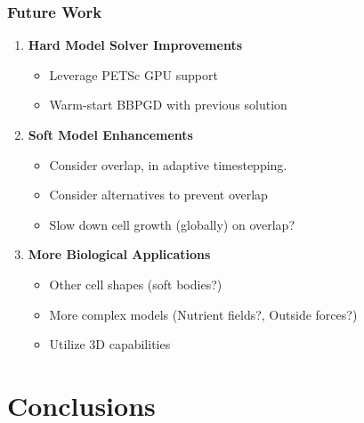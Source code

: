 \documentclass[10pt,t]{beamer}
\begin{document}
\begin{frame}
    \frametitle{Future Work}

    \begin{enumerate}
        \item \textbf{Hard Model Solver Improvements}
              \begin{itemize}
                  \item Leverage PETSc GPU support
                  \item Warm-start BBPGD with previous solution
              \end{itemize}

              \vspace{0.3cm}

        \item \textbf{Soft Model Enhancements}
              \begin{itemize}
                  \item Consider overlap, in adaptive timestepping.
                  \item Consider alternatives to prevent overlap
                  \item Slow down cell growth (globally) on overlap?
              \end{itemize}

              \vspace{0.3cm}

        \item \textbf{More Biological Applications}
              \begin{itemize}
                  \item Other cell shapes (soft bodies?)
                  \item More complex models (Nutrient fields?, Outside forces?)
                  \item Utilize 3D capabilities
              \end{itemize}
    \end{enumerate}

\end{frame}


\section*{Conclusions}
\end{document}
